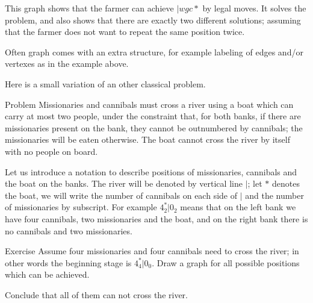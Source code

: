 \begin{center}
\end{center}

This graph shows that the farmer can achieve ${}|{wgc{*}}$ by legal moves.
It solves the problem, and also shows that there are exactly two different solutions;
assuming that the farmer does not want to repeat the same position twice. 
\qeds

Often graph comes with an extra structure, for example labeling of edges and/or vertexes as in the example above.

Here is a small variation of an other classical problem.

\begin{thm}{Problem} Missionaries and cannibals must cross a river using a boat which can carry at most two people, under the constraint that, for both banks, if there are missionaries present on the bank, they cannot be outnumbered by cannibals; the missionaries will be eaten otherwise.
The boat cannot cross the river by itself with no people on board.
\end{thm}

Let us introduce a notation to describe positions of missionaries, cannibals and the boat on the banks.
The river will be denoted by vertical line $|$;
let $*$ denotes the boat, we will write the number of cannibals on each side of $|$ and the number of missionaries by subscript. 
For example $4_2^*|0_2$ means that on the left bank we have four cannibals, two missionaries and the boat, and on the right bank there is no cannibals and two missionaries.

\begin{thm}{Exercise}
Assume four missionaries and four cannibals need to cross the river; in other words the beginning stage is $4_4^*|0_0$.
Draw a graph for all possible positions which can be achieved.

Conclude that all of them can not cross the river.
\end{thm}
